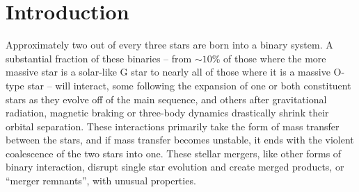 \chapter{Introduction}


Approximately two out of every three stars are born into a binary system.  A substantial fraction of these binaries -- {\charles from $\sim10$\% of those where the more massive star is a solar-like G star to nearly all of those where it is a massive O-type star \citep{moed16} }-- will interact, some following the expansion of one or both constituent stars as they evolve off of the main sequence, and others after gravitational radiation, magnetic braking or three-body dynamics drastically shrink their orbital separation.  These interactions primarily take the form of mass transfer between the stars, and if mass transfer becomes unstable, it ends with the violent coalescence of the two stars into one.  These stellar mergers, like other forms of binary interaction, disrupt single star evolution and create merged products, or ``merger remnants'', with unusual properties.


